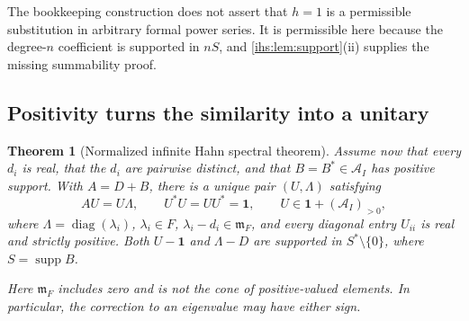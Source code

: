 \documentclass[11pt,a4paper]{article}
\numberwithin{equation}{section}
\newtheorem{theorem}{Theorem}[section]
\theoremstyle{definition}
\theoremstyle{remark}
\newcommand{\Fld}{F}
\newcommand{\mF}{\mathfrak m_F}
\newcommand{\Arf}{\mathcal A_I}
\newcommand{\supp}{\operatorname{supp}}
\newcommand{\diag}{\operatorname{diag}}
\newcommand{\Id}{\mathbf 1}
\begin{document}
The bookkeeping construction does not assert that $h=1$ is a permissible
substitution in arbitrary formal power series. It is permissible here
because the degree-$n$ coefficient is supported in $nS$, and
\cref{ihs:lem:support}(ii) supplies the missing summability proof.

\subsection{Positivity turns the similarity into a unitary}\label{ihs:rf:sec:unitary}

\begin{theorem}[Normalized infinite Hahn spectral theorem]\label{ihs:rf:thm:unitary}
Assume now that every $d_i$ is real, that the $d_i$ are pairwise distinct,
and that $B=B^*\in\Arf$ has positive support. With $A=D+B$, there is a
unique pair $(U,\Lambda)$ satisfying
\begin{equation}\label{ihs:rf:eq:unitarymain}
 AU=U\Lambda,\qquad U^*U=UU^*=\Id,\qquad U\in\Id+(\Arf)_{>0},
\end{equation}
where $\Lambda=\diag(\lambda_i)$, $\lambda_i\in\Fld$,
$\lambda_i-d_i\in\mF$, and every diagonal entry $U_{ii}$ is real and
strictly positive. Both $U-\Id$ and $\Lambda-D$ are supported in
$S^*\setminus\{0\}$, where $S=\supp B$.

Here $\mF$ includes zero and is not the cone of positive-valued elements.
In particular, the correction to an eigenvalue may have either sign.
\end{theorem}
\end{document}
